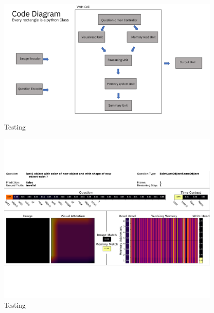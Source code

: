 \documentclass{article}
\theoremstyle{remark}
\theoremstyle{definition}
\begin{document}
\noindent\makebox[\linewidth]{\rule{\paperwidth}{1pt}}



\begin{figure}[b]
	\centering
	\includegraphics[width=\textwidth]{img/model}
	\caption{Testing}
	\label{fig:model}
\end{figure}

\begin{figure}[b]
	\centering
	\includegraphics[width=\textwidth]{img/model2}
	\caption{Testing}
	\label{fig:model}
\end{figure}


\newpage

\end{document}
